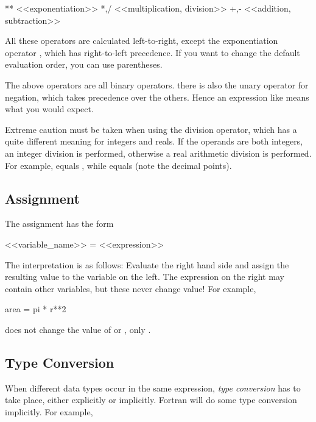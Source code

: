 \begin{fortran77}
      **   <<{exponentiation}>>
      *,/  <<{multiplication, division}>>
      +,-  <<{addition, subtraction}>>
\end{fortran77}

All these operators are calculated left-to-right, except the
exponentiation operator \inlinecode{**}, which has right-to-left
precedence. If you want to change the default evaluation order, you can
use parentheses.

The above operators are all binary operators. there is also the unary
operator \inlinefortranss{-} for negation, which takes precedence over
the others. Hence an expression like  means what
you would expect.

Extreme caution must be taken when using the division operator, which
has a quite different meaning for integers and reals. If the operands
are both integers, an integer division is performed, otherwise a real
arithmetic division is performed. For example, 
equals , while  equals
 (note the decimal points).


\subsection*{Assignment}

The assignment has the form

\begin{fortran77}
      <<variable_name>> = <<expression>>
\end{fortran77}

The interpretation is as follows: Evaluate the right hand side and
assign the resulting value to the variable on the left. The expression
on the right may contain other variables, but these never change value!
For example,

\begin{fortran77}
      area = pi * r**2
\end{fortran77}

does not change the value of  or
, only .


\subsection*{Type Conversion}

When different data types occur in the same expression, \textit{type
conversion} has to take place, either explicitly or implicitly. Fortran
will do some type conversion implicitly. For example,

